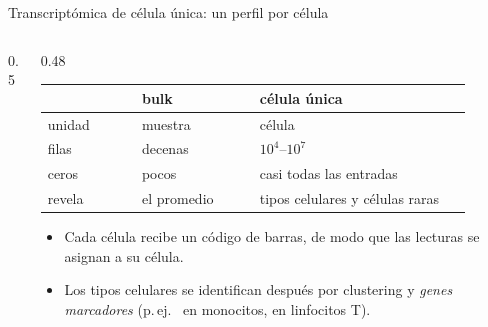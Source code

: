 \begin{frame}{Transcriptómica de célula única: un perfil por célula}
  \begin{columns}[c]
    \begin{column}{0.5\linewidth}
      \centering
    \end{column}
    \begin{column}{0.48\linewidth}\small
      \begin{tabular}{@{}>{\raggedright\arraybackslash}p{0.2\linewidth}>{\raggedright\arraybackslash}p{0.25\linewidth}>{\raggedright\arraybackslash}p{0.45\linewidth}@{}}
        \toprule
        & \textbf{bulk} & \textbf{célula única}\\\midrule
        unidad & muestra & célula\\
        filas & decenas & $10^4$--$10^7$\\
        ceros & pocos & casi todas las entradas\\
        revela & el promedio & tipos celulares y células raras\\
        \bottomrule
      \end{tabular}
      \vspace{0.25cm}
      \begin{itemize}\footnotesize\setlength\itemsep{3pt}
        \item Cada célula recibe un \alert{código de barras}, de modo que las lecturas se asignan a su célula.
        \item Los tipos celulares se identifican después por clustering y \emph{genes marcadores} (p.\,ej.\  en monocitos,  en linfocitos T).
      \end{itemize}
    \end{column}
  \end{columns}
\end{frame}

